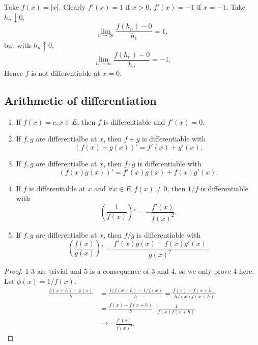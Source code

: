 \begin{example}
    Take $f(x)=|x|$. Clearly $f'(x)=1$ if $x>0$, $f'(x)=-1$ if $x=-1$. Take $ h_n\downarrow 0 $,
    \[
        \lim_{n \to \infty} \frac{f(h_n)-0}{h_1}=1,
    \]
    but with $ h_n \uparrow 0 $,
    \[
        \lim_{n \to \infty} \frac{f(h_n)-0}{h_n}=-1.
    \]
    Hence $f$ is not differentiable at $x=0$.
\end{example}
\subsection{Arithmetic of differentiation}
\begin{proposition}
    \begin{enumerate}
        \item If $f(x)=c,x\in E$, then $f$ is differentiable and $f'(x)=0$.
        \item If $f,g$ are differentialbe at $x$, then $f+g$ is differentiable with
        \[
            (f(x)+g(x))' = f'(x)+g'(x).
        \]
        \item If $f,g$ are differentialbe at $x$, then $f\cdot g$ is differentiable with
        \[
            (f(x)g(x))'=f'(x)g(x)+f(x)g'(x).
        \]
        \item If $f$ is differentiable at $x$ and $ \forall x\in E,f(x)\neq 0 $, then $ 1/f $ is differentiable with 
        \[
            \left( \frac{1}{f(x)} \right)' = -\frac{f'(x)}{f(x)^2}.
        \]
        \item If $f,g$ are differentialbe at $x$, then $f/ g$ is differentiable with
        \[
            \left( \frac{f(x)}{g(x)} \right)' = \frac{f'(x)g(x)-f(x)g'(x)}{g(x)^2}.
        \]
    \end{enumerate}
\end{proposition}
\begin{proof}
    1-3 are trivial and 5 is a consequence of 3 and 4, so we only prove 4 here. Let $ \phi(x) = 1/f(x) $. 
    \begin{align*}
        \frac{\phi(x+h)-\phi(x)}{h} &= \frac{1/f(x+h)-1/f(x)}{h}=\frac{f(x)-f(x+h)}{hf(x)f(x+h)}  \\ 
        &= \frac{f(x)-f(x+h)}{h}\cdot \frac{1}{f(x)f(x+h)}\\ 
        &\to -\frac{f'(x)}{f(x)^2}.
    \end{align*}
\end{proof}